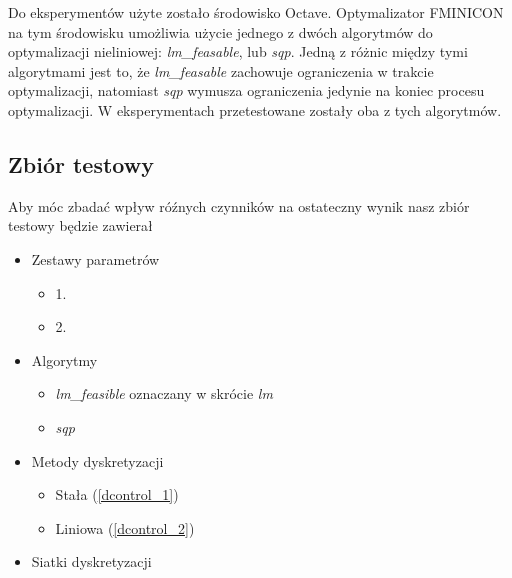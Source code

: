 \documentclass[11pt]{article}
\def\iif{\operatorname{if}}
\begin{document}
Do eksperymentów użyte zostało środowisko Octave. Optymalizator FMINICON na tym środowisku umożliwia użycie jednego z dwóch algorytmów do optymalizacji nieliniowej: {\it lm\_feasable}, lub {\it sqp}. Jedną z różnic między tymi algorytmami jest to, że {\it lm\_feasable\/} zachowuje ograniczenia w trakcie optymalizacji, natomiast {\it sqp\/} wymusza ograniczenia jedynie na koniec procesu optymalizacji. W eksperymentach przetestowane zostały oba z tych algorytmów.

\subsection{Zbiór testowy}
Aby móc zbadać wpływ róźnych czynników na ostateczny wynik nasz zbiór testowy będzie zawierał
\begin{itemize}
\item{Zestawy parametrów}
  \begin{itemize}
  \item{1.}
  \item{2.}
  \end{itemize}
\item{Algorytmy}
  \begin{itemize}
  \item{\it lm\_feasible\/} oznaczany w skrócie {\it lm\/}
  \item{\it sqp\/}
  \end{itemize}
\item{Metody dyskretyzacji}
  \begin{itemize}
  \item{Stała} (\ref{dcontrol_1})
  \item{Liniowa} (\ref{dcontrol_2})
  \end{itemize}
\item{Siatki dyskretyzacji}
\end{itemize}
\end{document}
